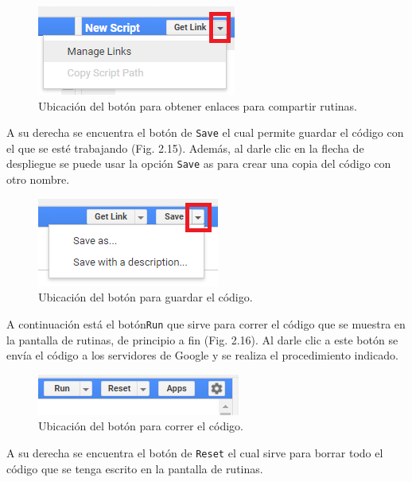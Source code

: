 \documentclass[
  12pt,
  letterpaper,
  twoside]{book}
\begin{document}
\begin{figure}[btp]

{\centering \includegraphics[width=0.3\linewidth]{Img/links} 

}

\caption{Ubicación del botón para obtener enlaces para compartir rutinas.}\label{fig:unnamed-chunk-15}
\end{figure}

A su derecha se encuentra el botón de \texttt{Save} el cual permite guardar el código con el que se esté trabajando (Fig. 2.15). Además, al darle clic en la flecha de despliegue se puede usar la opción \texttt{Save} as para crear una copia del código con otro nombre.

\begin{figure}[btp]

{\centering \includegraphics[width=0.3\linewidth]{Img/save} 

}

\caption{Ubicación del botón para guardar el código.}\label{fig:unnamed-chunk-16}
\end{figure}

A continuación está el botón\texttt{Run} que sirve para correr el código que se muestra en la pantalla de rutinas, de principio a fin (Fig. 2.16). Al darle clic a este botón se envía el código a los servidores de Google y se realiza el procedimiento indicado.

\begin{figure}[btp]

{\centering \includegraphics[width=0.3\linewidth]{Img/run} 

}

\caption{Ubicación del botón para correr el código.}\label{fig:unnamed-chunk-17}
\end{figure}

A su derecha se encuentra el botón de \texttt{Reset} el cual sirve para borrar todo el código que se tenga escrito en la pantalla de rutinas.
\end{document}
